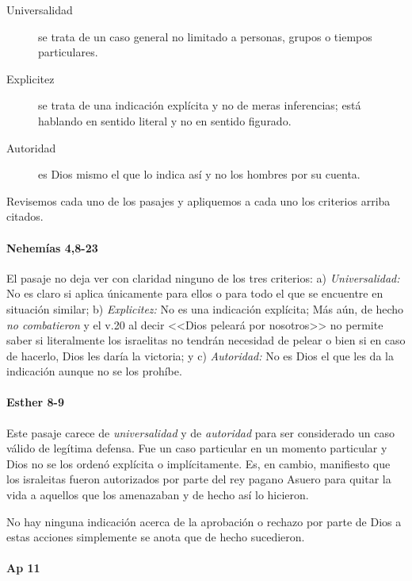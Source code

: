 \documentclass{article}
\begin{document}
\begin{description}
\item[Universalidad] se trata de un caso general no limitado a personas, grupos o tiempos particulares.
\item[Explicitez] se trata de una indicaci\'{o}n expl\'{i}cita y no de meras inferencias; est\'a hablando en sentido literal y no en sentido figurado.
\item[Autoridad] es Dios mismo el que lo indica as\'{i} y no los hombres por su cuenta.
\end{description}

\noindent
Revisemos cada uno de los pasajes y apliquemos a cada uno los criterios arriba citados.

\paragraph{Nehem\'{i}as 4,8-23}

El pasaje no deja ver con claridad ninguno de los tres criterios: a) \emph{Universalidad:} No es claro si aplica \'unicamente para ellos o para todo el que se encuentre en situaci\'on similar; b) \emph{Explicitez:} No es una indicaci\'on expl\'{i}cita; M\'as a\'un, de hecho \emph{no combatieron} y el v.20 al decir <<Dios pelear\'a por nosotros>> no permite saber si literalmente los israelitas no tendr\'an necesidad de pelear o bien si en caso de hacerlo, Dios les dar\'{i}a la victoria; y c) \emph{Autoridad:} No es Dios el que les da la indicaci\'on aunque no se los proh\'{i}be.

\paragraph{Esther 8-9}

Este pasaje carece de \emph{universalidad} y de \emph{autoridad} para ser considerado un caso v\'alido de leg\'{i}tima defensa. Fue un caso particular en un momento particular y Dios no se los orden\'o expl\'{i}cita o impl\'{i}citamente. Es, en cambio, manifiesto que los israleitas fueron autorizados por parte del rey pagano Asuero para quitar la vida a aquellos que los amenazaban y de hecho as\'{i} lo hicieron.

No hay ninguna indicaci\'on acerca de la aprobaci\'on o rechazo por parte de Dios a estas acciones simplemente se anota que de hecho sucedieron.

\paragraph{Ap 11}
\end{document}
